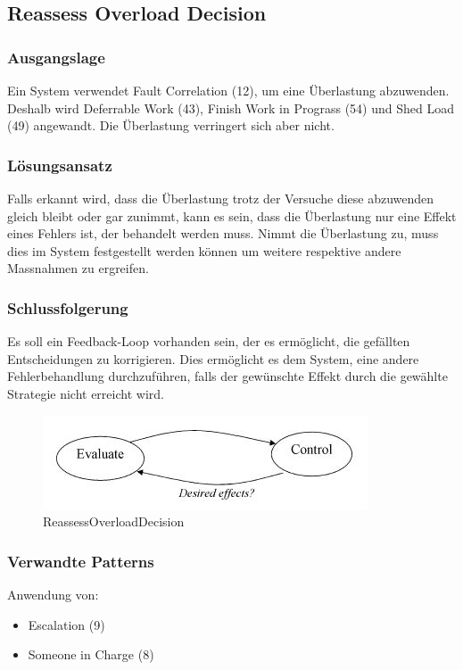 \subsection{Reassess Overload Decision}

\subsubsection*{Ausgangslage}

Ein System verwendet Fault Correlation (12), um eine Überlastung abzuwenden. Deshalb wird Deferrable Work (43), Finish Work in Prograss (54) und Shed Load (49) angewandt. Die Überlastung verringert sich aber nicht.

\subsubsection*{Lösungsansatz}

Falls erkannt wird, dass die Überlastung trotz der Versuche diese abzuwenden gleich bleibt oder gar zunimmt, kann es sein, dass die Überlastung nur eine Effekt eines Fehlers ist, der behandelt werden muss. Nimmt die Überlastung zu, muss dies im System festgestellt werden können um weitere respektive andere Massnahmen zu ergreifen.

\subsubsection*{Schlussfolgerung}

Es soll ein Feedback-Loop vorhanden sein, der es ermöglicht, die gefällten Entscheidungen zu korrigieren. Dies ermöglicht es dem System, eine andere Fehlerbehandlung durchzuführen, falls der gewünschte Effekt durch die gewählte Strategie nicht erreicht wird.

\begin{figure}[H]
	\centering
	\includegraphics[width=\textwidth]{content/faulttolerance/images/ReassessOverloadDecision.JPG}
	\caption{ReassessOverloadDecision}
\end{figure}


\subsubsection*{Verwandte Patterns}

Anwendung von:
\begin{itemize}
	\item Escalation (9)
\end{itemize}

\begin{itemize}
	\item Someone in Charge (8)
\end{itemize}



